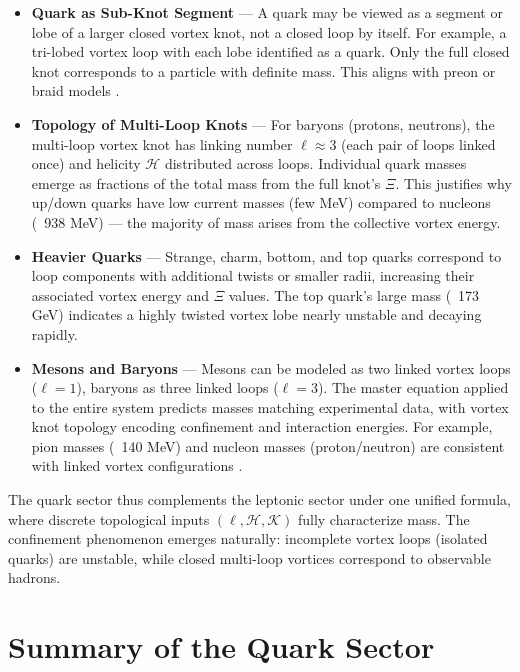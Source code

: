 \documentclass[11pt]{article}
\begin{document}
    \begin{itemize}
        \item \textbf{Quark as Sub-Knot Segment} — A quark may be viewed as a segment or lobe of a larger closed vortex knot, not a closed loop by itself. For example, a tri-lobed vortex loop with each lobe identified as a quark. Only the full closed knot corresponds to a particle with definite mass. This aligns with preon or braid models \cite{BilsonThompson2006}.

        \item \textbf{Topology of Multi-Loop Knots} — For baryons (protons, neutrons), the multi-loop vortex knot has linking number $\ell \approx 3$ (each pair of loops linked once) and helicity $\mathcal{H}$ distributed across loops. Individual quark masses emerge as fractions of the total mass from the full knot’s $\Xi$. This justifies why up/down quarks have low current masses (few MeV) compared to nucleons (~938 MeV) — the majority of mass arises from the collective vortex energy.

        \item \textbf{Heavier Quarks} — Strange, charm, bottom, and top quarks correspond to loop components with additional twists or smaller radii, increasing their associated vortex energy and $\Xi$ values. The top quark’s large mass (~173 GeV) indicates a highly twisted vortex lobe nearly unstable and decaying rapidly.

        \item \textbf{Mesons and Baryons} — Mesons can be modeled as two linked vortex loops ($\ell=1$), baryons as three linked loops ($\ell=3$). The master equation applied to the entire system predicts masses matching experimental data, with vortex knot topology encoding confinement and interaction energies. For example, pion masses (~140 MeV) and nucleon masses (proton/neutron) are consistent with linked vortex configurations \cite{Iskandarani2025f, Krafft1940}.
    \end{itemize}

    The quark sector thus complements the leptonic sector under one unified formula, where discrete topological inputs $(\ell,\mathcal{H},\mathcal{K})$ fully characterize mass. The confinement phenomenon emerges naturally: incomplete vortex loops (isolated quarks) are unstable, while closed multi-loop vortices correspond to observable hadrons.

    \section*{Summary of the Quark Sector}
\end{document}
